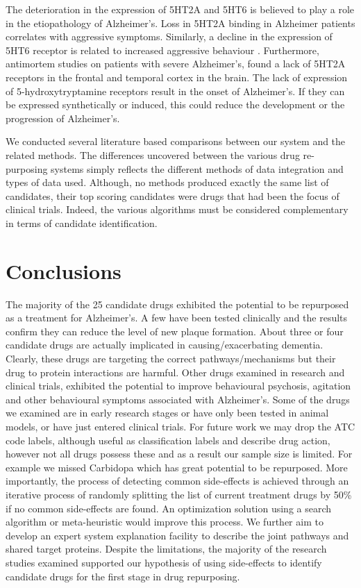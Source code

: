 \documentclass[preprint,11pt]{elsarticle}
\begin{document}
The deterioration in the expression of 5HT2A and 5HT6 is believed to play a role in the etiopathology of Alzheimer's. Loss in 5HT2A binding in Alzheimer patients correlates with aggressive symptoms. Similarly, a decline in the expression of 5HT6 receptor is related to increased aggressive behaviour \cite{Lorke2006}. Furthermore, antimortem studies on patients with severe Alzheimer's, found a lack of 5HT2A receptors in the frontal and temporal cortex in the brain. The lack of expression of 5-hydroxytryptamine receptors result in the onset of Alzheimer's. If they can be expressed synthetically or induced, this could reduce the development or the progression of Alzheimer's.  

We conducted several literature based comparisons between our system and the related methods. The differences uncovered between the various drug re-purposing systems  simply reflects the different methods of data integration and types of data used. Although, no methods produced exactly the same list of candidates, their top scoring candidates were drugs that had been the focus of clinical trials.  Indeed, the various algorithms must be considered complementary in terms of candidate identification. 

\section{Conclusions}
The majority of the 25 candidate drugs exhibited the potential to be repurposed as a treatment for Alzheimer's. A few have been tested clinically and the results confirm they can reduce the level of new plaque formation. About three or four candidate drugs are actually implicated in causing/exacerbating dementia. Clearly, these drugs are targeting the correct pathways/mechanisms but  their drug to protein interactions are harmful. Other drugs examined in research and clinical trials, exhibited the potential to improve behavioural psychosis, agitation and other behavioural symptoms associated with Alzheimer's.   Some of the drugs we examined are in early research stages or have only been tested in animal models, or have just entered clinical trials. For future work we may drop the ATC code labels, although useful as classification labels and describe drug action, however not all drugs possess these and as a result our sample size is limited. For example we missed  Carbidopa which has great potential to be repurposed. More importantly, the process of detecting common side-effects is achieved through an iterative process of randomly splitting the list of current treatment drugs by 50\% if no common side-effects are found. An optimization solution using a search algorithm or meta-heuristic would improve this process. We further aim to develop an expert system explanation facility to describe the joint pathways and shared target proteins. Despite the limitations, the majority of the research studies examined supported our hypothesis of using side-effects to identify candidate drugs for the first stage in drug repurposing. 
\end{document}
